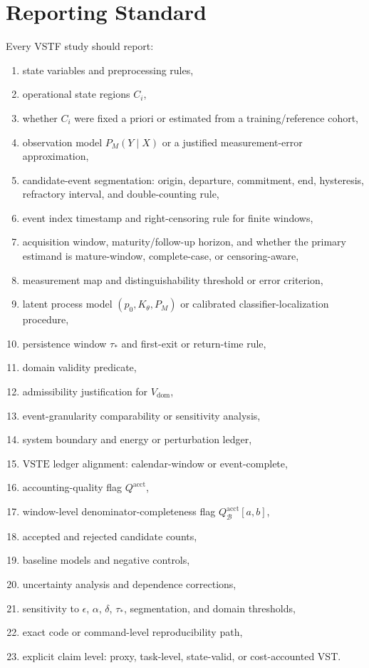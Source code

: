 \documentclass[11pt,a4paper]{article}
\newcommand{\VSTE}{\ensuremath{\mathrm{VSTE}}}
\newcommand{\1}{\mathbf{1}}
\begin{document}
\section{Reporting Standard}

Every VSTF study should report:

\begin{enumerate}
  \item state variables and preprocessing rules,
  \item operational state regions $C_i$,
  \item whether $C_i$ were fixed a priori or estimated from a training/reference cohort,
  \item observation model $P_M(Y\mid X)$ or a justified measurement-error approximation,
  \item candidate-event segmentation: origin, departure, commitment, end, hysteresis, refractory interval, and double-counting rule,
  \item event index timestamp and right-censoring rule for finite windows,
  \item acquisition window, maturity/follow-up horizon, and whether the primary estimand is mature-window, complete-case, or censoring-aware,
  \item measurement map and distinguishability threshold or error criterion,
  \item latent process model $(p_0,K_\theta,P_M)$ or calibrated classifier-localization procedure,
  \item persistence window $\tau_\ast$ and first-exit or return-time rule,
  \item domain validity predicate,
  \item admissibility justification for $V_{\mathrm{dom}}$,
  \item event-granularity comparability or sensitivity analysis,
  \item system boundary and energy or perturbation ledger,
  \item \VSTE{} ledger alignment: calendar-window or event-complete,
  \item accounting-quality flag $Q^{\mathrm{acct}}$,
  \item window-level denominator-completeness flag $Q_{\mathcal{B}}^{\mathrm{acct}}[a,b]$,
  \item accepted and rejected candidate counts,
  \item baseline models and negative controls,
  \item uncertainty analysis and dependence corrections,
  \item sensitivity to $\epsilon$, $\alpha$, $\delta$, $\tau_\ast$, segmentation, and domain thresholds,
  \item exact code or command-level reproducibility path,
  \item explicit claim level: proxy, task-level, state-valid, or cost-accounted VST.
\end{enumerate}
\end{document}
